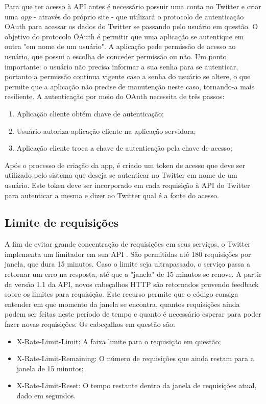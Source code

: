 Para que ter acesso à API antes é necessário possuir uma conta no Twitter e criar uma \textit{app} - através do próprio site \cite{twitterapp} - que utilizará o protocolo de autenticação OAuth\cite{oauth} para acessar os dados do Twitter se passando pelo usuário em questão. O objetivo do protocolo OAuth é permitir que uma aplicação se autentique em outra "em nome de um usuário". A aplicação pede permissão de acesso ao usuário, que possui a escolha de conceder permissão ou não. Um ponto importante: o usuário não precisa informar a sua senha para se autenticar, portanto a permissão continua vigente caso a senha do usuário se altere, o que permite que a aplicação não precise de manutenção neste caso, tornando-a mais resiliente. A autenticação por meio do OAuth necessita de três passos:

\begin{enumerate}
	\item Aplicação cliente obtém chave de autenticação;
	\item Usuário autoriza aplicação cliente na aplicação servidora;
	\item Aplicação cliente troca a chave de autenticação pela chave de acesso;
\end{enumerate}

Após o processo de criação da app, é criado um token de acesso que deve ser utilizado pelo sistema que deseja se autenticar no Twitter em nome de um usuário. Este token deve ser incorporado em cada requisição à API do Twitter para autenticar a mesma e dizer ao Twitter qual é a fonte do acesso.

\subsection{Limite de requisições}
A fim de evitar grande concentração de requisições em seus serviços, o Twitter implementa um limitador em sua API \cite{twitterrequestlimit2016}. São permitidas até 180 requisições por janela, que dura 15 minutos. Caso o limite seja ultrapassado, o serviço passa a retornar um erro na resposta, até que a "janela" de 15 minutos se renove.
A partir da versão 1.1 da API, novos cabeçalhos HTTP são retornados provendo feedback sobre os limites para requisição. Este recurso permite que o código consiga entender em que momento da janela se encontra, quantos requisições ainda podem ser feitas neste período de tempo e quanto é necessário esperar para poder fazer novas requisições. Os cabeçalhos em questão são:

\begin{itemize}
	\item X-Rate-Limit-Limit: A faixa limite para o requisição em questão;
	\item X-Rate-Limit-Remaining: O número de requisições que ainda restam para a janela de 15 minutos;
	\item X-Rate-Limit-Reset: O tempo restante dentro da janela de requisições atual, dado em segundos.
\end{itemize}

